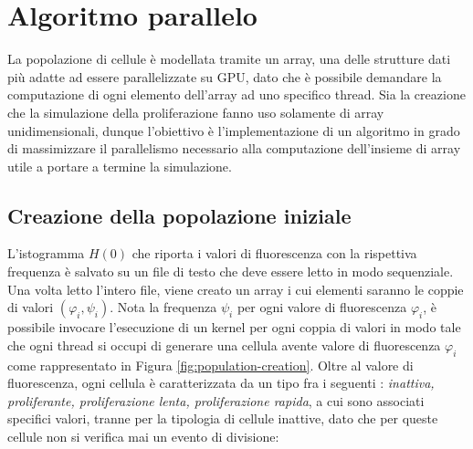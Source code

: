 \section{Algoritmo parallelo}

La popolazione di cellule è modellata tramite un array, una delle strutture
dati più adatte ad essere parallelizzate su GPU, dato che è possibile
demandare la computazione di ogni elemento dell'array ad uno specifico thread.
Sia la creazione che la simulazione della proliferazione fanno uso solamente di
array unidimensionali, dunque l'obiettivo è l'implementazione di un
algoritmo in grado di massimizzare il parallelismo necessario alla computazione
dell'insieme di array utile a portare a termine la simulazione. 

\subsection{Creazione della popolazione iniziale}

L'istogramma $H(0)$ che riporta i valori di fluorescenza con la rispettiva
frequenza è salvato su un file di testo che deve essere letto in modo
sequenziale. Una volta letto l'intero file, viene creato un array i cui
elementi saranno le coppie di valori $(\varphi_{i}, \psi_{i})$.
Nota la frequenza $\psi_{i}$ per ogni valore di fluorescenza $\varphi_{i}$,
è possibile invocare l'esecuzione di un kernel per ogni coppia di
valori 
in modo tale che ogni thread si occupi di generare una cellula avente 
valore di fluorescenza $\varphi_{i}$ come rappresentato in Figura
\ref{fig:population-creation}.
Oltre al valore di fluorescenza, ogni cellula è caratterizzata da un tipo 
fra i seguenti \cite{aml2018unimib}: 
\textit{inattiva, proliferante, proliferazione lenta, proliferazione rapida}, 
a cui sono associati specifici valori, tranne per la tipologia di cellule
inattive, dato che per queste cellule non si verifica mai un evento di 
divisione:

